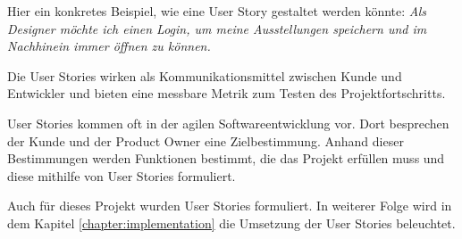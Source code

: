 Hier ein konkretes Beispiel, wie eine User Story gestaltet werden könnte: 
\emph{Als Designer möchte ich einen Login, um meine Ausstellungen speichern und im Nachhinein immer öffnen zu können.}

Die User Stories wirken als Kommunikationsmittel zwischen Kunde und Entwickler und bieten eine messbare Metrik zum Testen des Projektfortschritts. \cite{AgileVorgehensmodelle}

User Stories kommen oft in der agilen Softwareentwicklung vor. Dort besprechen der Kunde und der Product Owner eine Zielbestimmung. Anhand dieser Bestimmungen werden Funktionen bestimmt, die das Projekt erfüllen muss und diese mithilfe von User Stories formuliert. \cite{AgileVorgehensmodelle}

Auch für dieses Projekt wurden User Stories formuliert.
In weiterer Folge wird in dem Kapitel \ref{chapter:implementation} die Umsetzung der User Stories beleuchtet.






